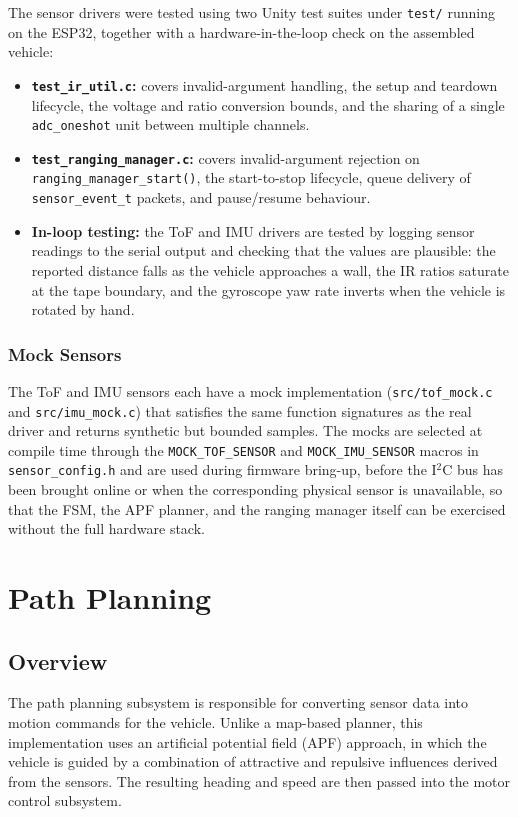The sensor drivers were tested using two Unity test suites under \texttt{test/} running on the ESP32, together with a hardware-in-the-loop check on the assembled vehicle:
\begin{itemize}
    \item \textbf{\texttt{test\_ir\_util.c}:} covers invalid-argument handling, the setup and teardown lifecycle, the voltage and ratio conversion bounds, and the sharing of a single \texttt{adc\_oneshot} unit between multiple channels.
    \item \textbf{\texttt{test\_ranging\_manager.c}:} covers invalid-argument rejection on \texttt{ranging\_manager\_start()}, the start-to-stop lifecycle, queue delivery of \texttt{sensor\_event\_t} packets, and pause/resume behaviour.
    \item \textbf{In-loop testing:} the ToF and IMU drivers are tested by logging sensor readings to the serial output and checking that the values are plausible: the reported distance falls as the vehicle approaches a wall, the IR ratios saturate at the tape boundary, and the gyroscope yaw rate inverts when the vehicle is rotated by hand.
\end{itemize}

\subsubsection{Mock Sensors}

The ToF and IMU sensors each have a mock implementation (\texttt{src/tof\_mock.c} and \texttt{src/imu\_mock.c}) that satisfies the same function signatures as the real driver and returns synthetic but bounded samples. The mocks are selected at compile time through the \texttt{MOCK\_TOF\_SENSOR} and \texttt{MOCK\_IMU\_SENSOR} macros in \texttt{sensor\_config.h} and are used during firmware bring-up, before the I$^2$C bus has been brought online or when the corresponding physical sensor is unavailable, so that the FSM, the APF planner, and the ranging manager itself can be exercised without the full hardware stack.

\section{Path Planning}

\subsection{Overview}

The path planning subsystem is responsible for converting sensor data into motion commands for the vehicle. Unlike a map-based planner, this implementation uses an artificial potential field (APF) approach, in which the vehicle is guided by a combination of attractive and repulsive influences derived from the sensors. The resulting heading and speed are then passed into the motor control subsystem.

